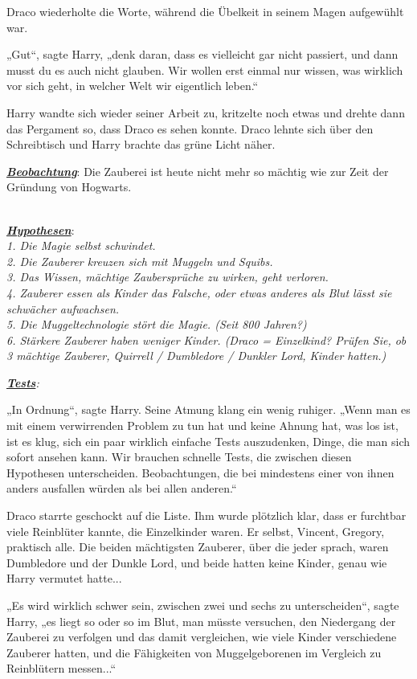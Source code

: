 {Draco wiederholte die Worte, während die Übelkeit in seinem Magen aufgewühlt war.

„Gut“, sagte Harry, „denk daran, dass es vielleicht gar nicht passiert, und dann musst du es auch nicht glauben. Wir wollen erst einmal nur wissen, was wirklich vor sich geht, in welcher Welt wir eigentlich leben.“

Harry wandte sich wieder seiner Arbeit zu, kritzelte noch etwas und drehte dann das Pergament so, dass Draco es sehen konnte. Draco lehnte sich über den Schreibtisch und Harry brachte das grüne Licht näher.

\emph{\textbf{\uline{Beobachtung}}}: Die Zauberei ist heute nicht mehr so mächtig wie zur Zeit der Gründung von Hogwarts.\\ \strut \\ \emph{\textbf{\uline{Hypothesen}}}:\\ \emph{1. Die Magie selbst schwindet.\\ 2. Die Zauberer kreuzen sich mit Muggeln und Squibs.\\ 3. Das Wissen, mächtige Zaubersprüche zu wirken, geht verloren.\\ 4. Zauberer essen als Kinder das Falsche, oder etwas anderes als Blut lässt sie schwächer aufwachsen.\\ 5. Die Muggeltechnologie stört die Magie. (Seit 800 Jahren?)\\ 6. Stärkere Zauberer haben weniger Kinder. (Draco = Einzelkind? Prüfen Sie, ob 3 mächtige Zauberer, Quirrell / Dumbledore / Dunkler Lord, Kinder hatten.)}

\textbf{\emph{\uline{Tests}}}\emph{:}

„In Ordnung“, sagte Harry. Seine Atmung klang ein wenig ruhiger. „Wenn man es mit einem verwirrenden Problem zu tun hat und keine Ahnung hat, was los ist, ist es klug, sich ein paar wirklich einfache Tests auszudenken, Dinge, die man sich sofort ansehen kann. Wir brauchen schnelle Tests, die zwischen diesen Hypothesen unterscheiden. Beobachtungen, die bei mindestens einer von ihnen anders ausfallen würden als bei allen anderen.“

Draco starrte geschockt auf die Liste. Ihm wurde plötzlich klar, dass er furchtbar viele Reinblüter kannte, die Einzelkinder waren. Er selbst, Vincent, Gregory, praktisch alle. Die beiden mächtigsten Zauberer, über die jeder sprach, waren Dumbledore und der Dunkle Lord, und beide hatten keine Kinder, genau wie Harry vermutet hatte...

„Es wird wirklich schwer sein, zwischen zwei und sechs zu unterscheiden“, sagte Harry, „es liegt so oder so im Blut, man müsste versuchen, den Niedergang der Zauberei zu verfolgen und das damit vergleichen, wie viele Kinder verschiedene Zauberer hatten, und die Fähigkeiten von Muggelgeborenen im Vergleich zu Reinblütern messen...“

}
